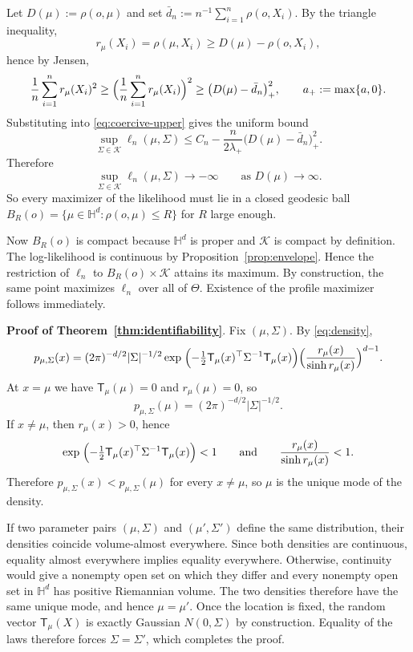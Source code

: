 \documentclass[11pt]{article}
\newcommand{\Hh}{\mathbb{H}}
\newcommand{\shell}{\mathcal{K}}
\newcommand{\T}{\mathsf{T}}
\begin{document}
Let $D(\mu):=\rho(o,\mu)$ and set $\bar d_n:=n^{-1}\sum_{i=1}^n \rho(o,X_i)$. By the triangle inequality,
\[
r_\mu(X_i)=\rho(\mu,X_i)\ge D(\mu)-\rho(o,X_i),
\]
hence by Jensen,
\[
\frac1n\sum_{i=1}^n r_\mu(X_i)^2
\ge
\Bigl(\frac1n\sum_{i=1}^n r_\mu(X_i)\Bigr)^2
\ge
\bigl(D(\mu)-\bar d_n\bigr)_+^2,
\qquad a_+:=\max\{a,0\}.
\]
Substituting into \eqref{eq:coercive-upper} gives the uniform bound
\begin{equation}
\label{eq:uniform-coercive}
\sup_{\Sigma\in\shell}\ell_n(\mu,\Sigma)
\le
C_n - \frac{n}{2\lambda_+}\bigl(D(\mu)-\bar d_n\bigr)_+^2.
\end{equation}
Therefore
\[
\sup_{\Sigma\in\shell}\ell_n(\mu,\Sigma)\to -\infty
\qquad\text{as }D(\mu)\to\infty.
\]
So every maximizer of the likelihood must lie in a closed geodesic ball $
B_R(o)=\{\mu\in\Hh^d:\rho(o,\mu)\le R\}
$ for $R$ large enough.

Now $B_R(o)$ is compact because $\Hh^d$ is proper \citep{petersen_2006_RiemannianGeometry}  and $\shell$ is compact by definition. The log-likelihood is continuous by Proposition~\ref{prop:envelope}. Hence the restriction of $\ell_n$ to $B_R(o)\times\shell$ attains its maximum. By construction, the same point maximizes $\ell_n$ over all of $\Theta$. Existence of the profile maximizer follows immediately.


\medskip 
\noindent \textbf{Proof of Theorem~\ref{thm:identifiability}}. Fix $(\mu,\Sigma)$. By \eqref{eq:density},
\[
p_{\mu,\Sigma}(x)
=
(2\pi)^{-d/2}|\Sigma|^{-1/2}
\exp\;\Bigl(-\tfrac12\T_\mu(x)^\top\Sigma^{-1}\T_\mu(x)\Bigr)
\Bigl(\frac{r_\mu(x)}{\sinh r_\mu(x)}\Bigr)^{d-1}.
\]
At $x=\mu$ we have $\T_\mu(\mu)=0$ and $r_\mu(\mu)=0$, so
\[
p_{\mu,\Sigma}(\mu)=(2\pi)^{-d/2}|\Sigma|^{-1/2}.
\]
If $x\neq \mu$, then $r_\mu(x)>0$, hence
\[
\exp\;\Bigl(-\tfrac12\T_\mu(x)^\top\Sigma^{-1}\T_\mu(x)\Bigr)<1
\qquad\text{and}\qquad
\frac{r_\mu(x)}{\sinh r_\mu(x)}<1.
\]
Therefore $p_{\mu,\Sigma}(x)<p_{\mu,\Sigma}(\mu)$ for every $x\neq \mu$, so $\mu$ is the unique mode of the density.

If two parameter pairs $(\mu,\Sigma)$ and $(\mu',\Sigma')$ define the same distribution, their densities coincide volume-almost everywhere. Since both densities are continuous, equality almost everywhere implies equality everywhere. Otherwise, continuity would give a nonempty open set on which they differ and every nonempty open set in $\Hh^d$ has positive Riemannian volume. The two densities therefore have the same unique mode, and hence $\mu=\mu'$. Once the location is fixed, the random vector $\T_\mu(X)$ is exactly Gaussian $N(0,\Sigma)$ by construction. Equality of the laws therefore forces $\Sigma=\Sigma'$, which completes the proof.
\end{document}
